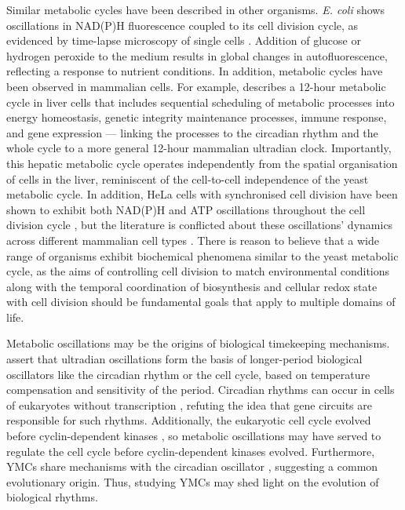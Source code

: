 Similar metabolic cycles have been described in other organisms.
\textit{E. coli} shows oscillations in NAD(P)H fluorescence coupled to its cell division cycle, as evidenced by time-lapse microscopy of single cells \parencite{zhangDynamicSinglecellNAD2018}.
Addition of glucose or hydrogen peroxide to the medium results in global changes in autofluorescence, reflecting a response to nutrient conditions.
In addition, metabolic cycles have been observed in mammalian cells.
For example, \textcite{zhuLogicTemporalCompartmentalization2022} describes a 12-hour metabolic cycle in liver cells that includes sequential scheduling of metabolic processes into energy homeostasis, genetic integrity maintenance processes, immune response, and gene expression --- linking the processes to the circadian rhythm and the whole cycle to a more general 12-hour mammalian ultradian clock.
Importantly, this hepatic metabolic cycle operates independently from the spatial organisation of cells in the liver, reminiscent of the cell-to-cell independence of the yeast metabolic cycle.
In addition, HeLa cells with synchronised cell division have been shown to exhibit both NAD(P)H and ATP oscillations throughout the cell division cycle \parencite{ahnTemporalFluxomicsReveals2017}, but the literature is conflicted about these oscillations' dynamics across different mammalian cell types \parencite{zylstraMetabolicDynamicsCell2022}.
There is reason to believe that a wide range of organisms exhibit biochemical phenomena similar to the yeast metabolic cycle, as the aims of controlling cell division to match environmental conditions along with the temporal coordination of biosynthesis and cellular redox state with cell division should be fundamental goals that apply to multiple domains of life.

Metabolic oscillations may be the origins of biological timekeeping mechanisms.
\textcite{lloydRedoxRhythmicityClocks2007} assert that ultradian oscillations form the basis of longer-period biological oscillators like the circadian rhythm or the cell cycle, based on temperature compensation and sensitivity of the period.
Circadian rhythms can occur in cells of eukaryotes without transcription \parencite{oneillCircadianRhythmsPersist2011,oneillCircadianClocksHuman2011}, refuting the idea that gene circuits are responsible for such rhythms.
Additionally, the eukaryotic cell cycle evolved before cyclin-dependent kinases \parencite{papagiannakisAutonomousMetabolicOscillations2017}, so metabolic oscillations may have served to regulate the cell cycle before cyclin-dependent kinases evolved.
Furthermore, YMCs share mechanisms with the circadian oscillator \parencite{caustonMetabolicCyclesYeast2015,arataQuantitativeStudiesCellDivision2019}, suggesting a common evolutionary origin.
Thus, studying YMCs may shed light on the evolution of biological rhythms.

